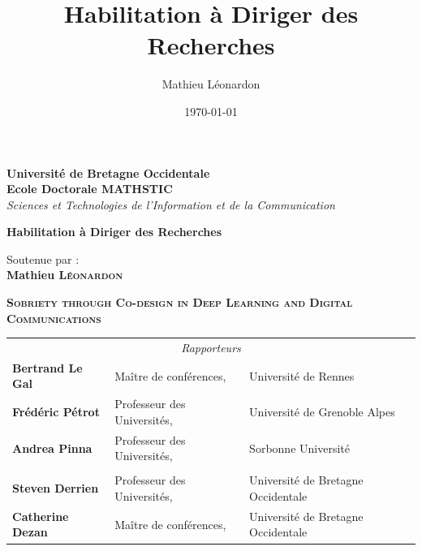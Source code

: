 \documentclass[11pt]{report}
\title{Habilitation à Diriger des Recherches}
\author{ Mathieu Léonardon }
\date{\today}
\begin{document}
\vspace*{0cm}
\begin{center}
  \Large{\textbf{Université de Bretagne Occidentale}} \\[0.5cm]
  \Large{\textbf{Ecole Doctorale MATHSTIC}} \\[0.1cm]
  \large{\textit{Sciences et Technologies de l'Information et de la Communication}}
\end{center}

\vfill
\begin{center}
  \Huge{\textbf{Habilitation à Diriger des Recherches}}
\end{center}

\vfill
\begin{center}
  \large{Soutenue par :} \\[0.1cm]
  \Large{\textbf{Mathieu \textsc{Léonardon}}}
\end{center}

\vfill
\begin{center}
  \centering
  \Huge{\textbf{\textsc{Sobriety through Co-design in Deep Learning and Digital Communications
      }}} \\[0.5cm]
\end{center}




\vfill
\begin{center}
\begin{tabularx}{\textwidth}{l X X}
    \multicolumn{3}{c}{\large\textit{Rapporteurs}} \\ \addlinespace[0.2cm]
    \large\textbf{Bertrand Le Gal} & \large Maître de conférences, &Université de Rennes \\ \addlinespace[0.1cm]
    \large\textbf{Frédéric Pétrot} & \large Professeur des Universités, &Université de Grenoble Alpes \\ \addlinespace[0.1cm]
    \large\textbf{Andrea Pinna}    & \large Professeur des Universités, &Sorbonne Université \\
    \addlinespace[0.5cm]
    \multicolumn{3}{c}{\large\textit{Examinateurs}} \\ \addlinespace[0.2cm]
    \large\textbf{Steven Derrien}  & \large Professeur des Universités, &Université de Bretagne Occidentale \\ \addlinespace[0.1cm]
    \large\textbf{Catherine Dezan}   & \large Maître de conférences, &Université de Bretagne Occidentale \\
\end{tabularx}
\end{center}
\vfill
\end{document}
